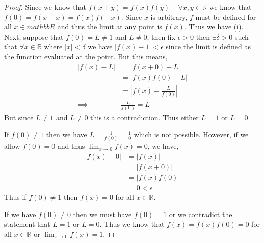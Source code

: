 \documentclass[leqno]{article}
\theoremstyle{nonumberplain}
\newtheorem{proof}{Proof}
\begin{document}
\begin{proof}
Since we know that $f(x+y)=f(x)f(y)$ ~ $\forall x,y \in \mathbb{R}$ we know that $f(0)=f(x-x)=f(x)f(-x)$.  Since $x$ is arbitrary, $f$ must be defined for all $x \in mathbb{R}$ and thus the limit at any point is $f(x)$.  Thus we have (i).  Next, suppose that $f(0)=L\neq 1$ and $L\neq 0$, then fix $\epsilon >0$ then $\exists \delta>0$ such that $\forall x \in \mathbb{R}$ where $|x|<\delta$ we have $|f(x)-1|<\epsilon$ since the limit is defined as the function evaluated at the point. But this means,
\begin{align*}
|f(x)-L|&=|f(x+0)-L|\\
&=|f(x)f(0)-L|\\
&=\left|f(x)-\frac{L}{f(0)}\right|\\
\implies & \frac{L}{f(0)}=L
\end{align*}
But since $L\neq 1$ and $L\neq 0$ this is a contradiction.  Thus either $L=1$ or $L=0$.

If $f(0)\neq 1$ then we have $L=\frac{1}{f(0)}=\frac{1}{0}$ which is not possible.  However, if we allow $f(0)=0$ and thus $\lim_{x \to 0} f(x) = 0$, we have,
\begin{align*}
|f(x)-0|&=|f(x)|\\
&=|f(x+0)|\\
&=|f(x)f(0)|\\
&=0<\epsilon
\end{align*}
Thus if $f(0)\neq 1$ then $f(x)=0$ for all $x \in \mathbb{R}$.

If we have $f(0) \neq 0$ then we must have $f(0)=1$ or we contradict the statement that $L=1$ or $L=0$.  Thus we know that $f(x)=f(x)f(0)=0$ for all $x\in \mathbb{R}$ or $\lim_{x \to 0} f(x) = 1$.
\end{proof}
\end{document}
